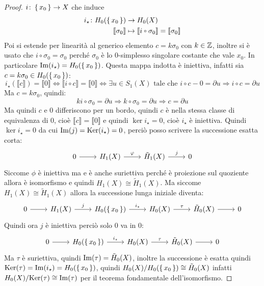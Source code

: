 \begin{proof}
  $ i \colon \set{x_0} \to X $ che induce
  \begin{align*}
    i_\star \colon H_0(\set{x_0}) & \to H_0(X) \\
    \llbracket\sigma_0\rrbracket & \mapsto \llbracket i \circ \sigma_0 \rrbracket = \llbracket \sigma_0 \rrbracket
  \end{align*}
  Poi si estende per linearità al generico elemento $ c = k \sigma_0 $ con $ k \in \mathbb{Z} $, inoltre
  si è usato che $ i \circ \sigma_0 = \sigma_0 $ perché $ \sigma_0 $ è lo $ 0 $-simplesso singolare
  costante che vale $ x_0 $. In particolare $ \mathrm{Im}( i_\star ) = H_0(\set{x_0}) $.
  Questa mappa indotta è iniettiva, infatti sia  $ c = k \sigma_0 \in H_0(\set{x_0}) $:
  \[
    i_\star(\llbracket c \rrbracket) = \llbracket 0 \rrbracket \iff \llbracket i \circ c \rrbracket = \llbracket 0 \rrbracket \iff \exists u \in S_1(X) \text{ tale che } i \circ c - 0 = \partial u \Rightarrow i \circ c = \partial u
  \]
  Ma $ c = k \sigma_0 $, quindi:
  \[
    k i \circ \sigma_0 = \partial u \Rightarrow k \circ \sigma_0 = \partial u \Rightarrow c = \partial u
  \]
  Ma quindi $ c $ e $ 0 $ differiscono per un bordo, quindi $ c $ è nella stessa classe
  di equivalenza di $ 0 $, cioè $ \llbracket c \rrbracket = \llbracket 0 \rrbracket $ e quindi $ \ker{i_\star} = 0 $, cioè $ i_\star $ è
  iniettiva.
  Quindi $ \ker{i_\star} = 0 $ da cui $ \mathrm{Im}( j ) = \mathrm{Ker}( i_\star) = 0 $, perciò posso scrivere
  la successione esatta corta:
  \[
    \begin{tikzcd}
      0 \rar & H_1(X) \rar{\phi} & \tilde{H}_1(X) \rar{j} & 0
    \end{tikzcd}
  \]
  Siccome $ \phi $ è iniettiva ma e è anche suriettiva perché è proiezione
  sul quoziente allora è isomorfismo e quindi $ H_1(X) \cong \tilde{H}_1(X) $.
  Ma siccome $ H_1(X) \cong \tilde{H}_1(X) $ allora la successione lunga iniziale diventa:
  \[
    \begin{tikzcd}
      0 \rar & H_1(X) \arrow{r}{j} & H_0(\set{x_0}) \arrow{r}{i_\star} &  H_0(X) \arrow{r}{\tau} & \tilde{H}_0(X) \arrow{r}{} & 0
    \end{tikzcd}
  \]
  Quindi ora $ j $ è iniettiva perciò solo $ 0 $ va in $ 0 $:
  \[
    \begin{tikzcd}
      0 \rar & H_0(\set{x_0}) \arrow{r}{i_\star} &  H_0(X) \arrow{r}{\tau} & \tilde{H}_0(X) \arrow{r}{} & 0
    \end{tikzcd}
  \]
  Ma $ \tau $ è suriettiva, quindi $ \mathrm{Im}( \tau ) = \tilde{H}_0(X) $, inoltre la
  successione è esatta quindi $ \mathrm{Ker}( \tau) = \mathrm{Im}( i_\star ) = H_0(\set{x_0}) $, quindi
  $ {H_0(X)} \slash {H_0(\set{x_0})} \cong \tilde{H}_0(X) $ infatti
  $ {H_0(X)} \slash {\mathrm{Ker}( \tau)} \cong \mathrm{Im}( \tau ) $ per il teorema fondamentale
  dell'isomorfismo.


\end{proof}
